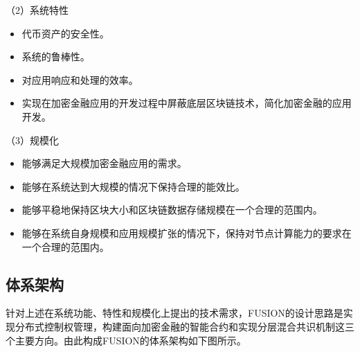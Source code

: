 \documentclass[a4paper,12pt]{article}
\begin{document}
（2）系统特性
\begin{itemize}[itemindent=1em]
	\item 代币资产的安全性。
	\item 系统的鲁棒性。
	\item 对应用响应和处理的效率。
	\item 实现在加密金融应用的开发过程中屏蔽底层区块链技术，简化加密金融的应用开发。
\end{itemize}

（3）规模化
\begin{itemize}[itemindent=1em]
	\item 能够满足大规模加密金融应用的需求。
	\item 能够在系统达到大规模的情况下保持合理的能效比。
	\item 能够平稳地保持区块大小和区块链数据存储规模在一个合理的范围内。
	\item 能够在系统自身规模和应用规模扩张的情况下，保持对节点计算能力的要求在一个合理的范围内。
\end{itemize}

\subsection{体系架构}

针对上述在系统功能、特性和规模化上提出的技术需求，FUSION的设计思路是实现分布式控制权管理，构建面向加密金融的智能合约和实现分层混合共识机制这三个主要方向。由此构成FUSION的体系架构如下图所示。
\end{document}

